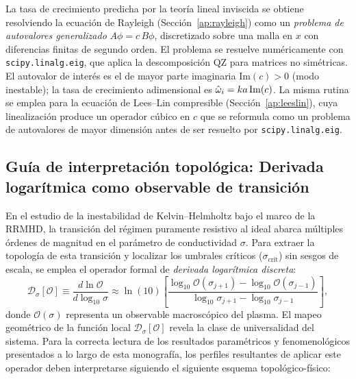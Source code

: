 \primerparrafo La tasa de crecimiento predicha por la teoría lineal inviscida se obtiene resolviendo la ecuación de Rayleigh (Sección~\ref{ap:rayleigh}) como un \emph{problema de autovalores generalizado} $A\phi = c\,B\phi$, discretizado sobre una malla en $x$ con diferencias finitas de segundo orden. El problema se resuelve numéricamente con \texttt{scipy.linalg.eig}, que aplica la descomposición QZ para matrices no simétricas. El autovalor de interés es el de mayor parte imaginaria $\mathrm{Im}(c)>0$ (modo inestable); la tasa de crecimiento adimensional es $\hat{\omega}_i = ka\,\mathrm{Im}(c)$. La misma rutina se emplea para la ecuación de Lees--Lin compresible (Sección~\ref{ap:leeslin}), cuya linealización produce un operador cúbico en $c$ que se reformula como un problema de autovalores de mayor dimensión antes de ser resuelto por \texttt{scipy.linalg.eig}.

\subsection{Guía de interpretación topológica: Derivada logarítmica como observable de transición}
\label{sec:manual_derivada_log}

En el estudio de la inestabilidad de Kelvin--Helmholtz bajo el marco de la RRMHD, la transición del régimen puramente resistivo al ideal abarca múltiples órdenes de magnitud en el parámetro de conductividad $\sigma$. Para extraer la topología de esta transición y localizar los umbrales críticos ($\sigma_{\text{crit}}$) sin sesgos de escala, se emplea el operador formal de \emph{derivada logarítmica discreta}:
\begin{equation}
    \mathcal{D}_\sigma[\mathcal{O}] \equiv \frac{d \ln \mathcal{O}}{d \log_{10} \sigma} \approx \ln(10) \left[ \frac{\log_{10} \mathcal{O}(\sigma_{j+1}) - \log_{10} \mathcal{O}(\sigma_{j-1})}{\log_{10} \sigma_{j+1} - \log_{10} \sigma_{j-1}} \right],
\end{equation}
donde $\mathcal{O}(\sigma)$ representa un observable macroscópico del plasma. El mapeo geométrico de la función local $\mathcal{D}_\sigma[\mathcal{O}]$ revela la clase de universalidad del sistema. Para la correcta lectura de los resultados paramétricos y fenomenológicos presentados a lo largo de esta monografía, los perfiles resultantes de aplicar este operador deben interpretarse siguiendo el siguiente esquema topológico-físico:

